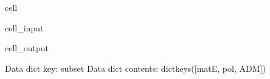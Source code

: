 \documentclass[letterpaper,table,10pt,english]{jupyterBook}
\begin{document}
\begin{sphinxuseclass}{cell}\begin{sphinxVerbatimInput}

\begin{sphinxuseclass}{cell_input}
\begin{sphinxVerbatim}[commandchars=\\\{\}]
\PYG{p}{[}\PYG{p}{]}
\end{sphinxVerbatim}

\end{sphinxuseclass}\end{sphinxVerbatimInput}
\begin{sphinxVerbatimOutput}

\begin{sphinxuseclass}{cell_output}
\begin{sphinxVerbatim}[commandchars=\\\{\}]
Data dict key: subset
Data dict contents: dict\PYGZus{}keys([\PYGZsq{}matE\PYGZsq{}, \PYGZsq{}pol\PYGZsq{}, \PYGZsq{}ADM\PYGZsq{}])
\end{sphinxVerbatim}

\end{sphinxuseclass}\end{sphinxVerbatimOutput}

\end{sphinxuseclass}
\end{document}
